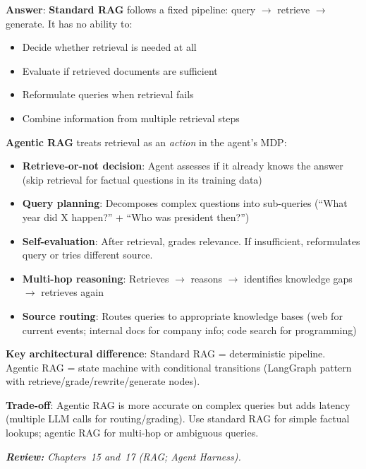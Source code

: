 \begin{questionbox}
\textbf{Answer}: \textbf{Standard RAG} follows a fixed pipeline: query $\to$ retrieve $\to$ generate. It has no ability to:

\begin{itemize}
  \item Decide whether retrieval is needed at all
  \item Evaluate if retrieved documents are sufficient
  \item Reformulate queries when retrieval fails
  \item Combine information from multiple retrieval steps
\end{itemize}

\textbf{Agentic RAG} treats retrieval as an \emph{action} in the agent’s MDP:

\begin{itemize}
  \item \textbf{Retrieve-or-not decision}: Agent assesses if it already knows the answer (skip retrieval for factual questions in its training data)
  \item \textbf{Query planning}: Decomposes complex questions into sub-queries (``What year did X happen?'' + ``Who was president then?'')
  \item \textbf{Self-evaluation}: After retrieval, grades relevance. If insufficient, reformulates query or tries different source.
  \item \textbf{Multi-hop reasoning}: Retrieves $\to$ reasons $\to$ identifies knowledge gaps $\to$ retrieves again
  \item \textbf{Source routing}: Routes queries to appropriate knowledge bases (web for current events; internal docs for company info; code search for programming)
\end{itemize}

\textbf{Key architectural difference}: Standard RAG = deterministic pipeline. Agentic RAG = state machine with conditional transitions (LangGraph pattern with retrieve/grade/rewrite/generate nodes).

\textbf{Trade-off}: Agentic RAG is more accurate on complex queries but adds latency (multiple LLM calls for routing/grading). Use standard RAG for simple factual lookups; agentic RAG for multi-hop or ambiguous queries.

\emph{\textbf{Review:} Chapters~15 and~17 (RAG; Agent Harness).}
\end{questionbox}

